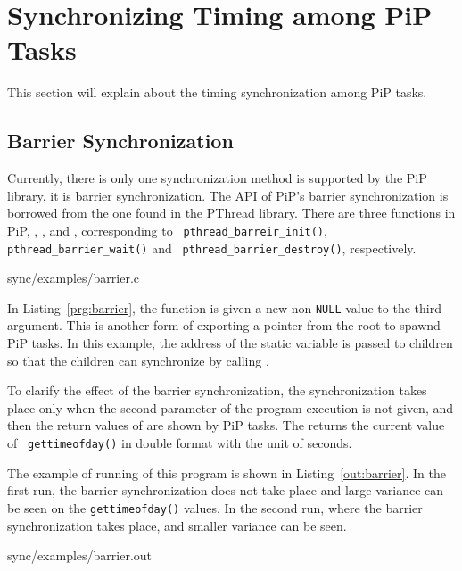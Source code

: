 
\section{Synchronizing Timing among PiP Tasks}

This section will explain about the timing synchronization among PiP
tasks.

\subsection{Barrier Synchronization}

Currently, there is only one synchronization method is supported by
the PiP library, it is barrier synchronization. The API of PiP's
barrier synchronization is borrowed from the one found in the PThread
library. There are three functions in PiP,
, , and
  , corresponding to {\tt
    pthread_barreir_init()}, {\tt pthread_barrier_wait()} and {\tt
        pthread_barrier_destroy()}, respectively. 

 {sync/examples/barrier.c}

In Listing~\ref{prg:barrier}, the  function is
given a new non-{\tt NULL} value to the third argument. This is
another form of exporting a pointer from the root to spawnd PiP
tasks. In this example, the address of the 
static variable is passed to children so that the children can
synchronize by calling .

To clarify the effect of the barrier synchronization, the
synchronization takes place only when the second parameter of the
program execution is not given, and then the return values of
 are shown by PiP tasks. The
 returns the current value of {\tt
  gettimeofday()} in double format with the unit of seconds.

The example of running of this program is shown in
Listing~\ref{out:barrier}. In the first run, the barrier
synchronization does not take place and large variance can be seen on
the {\tt gettimeofday()} values. In the second run, where the barrier
synchronization takes place, and smaller variance can be seen.

 {sync/examples/barrier.out}

